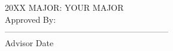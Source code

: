 \begin{flushleft}
    \vspace*{-0.20in}
    \hspace*{3.09in}20XX %
    \hspace*{3.09in}MAJOR: YOUR MAJOR\\ %
    \hspace*{3.09in}Approved By:\\
    \hspace*{3.09in}-----------------------------------------------------------\\
    \vspace*{-0.25in}
    \hspace*{3.09in}Advisor\hspace*{1.5in} Date\hspace*{0.1in}\\
\end{flushleft}
